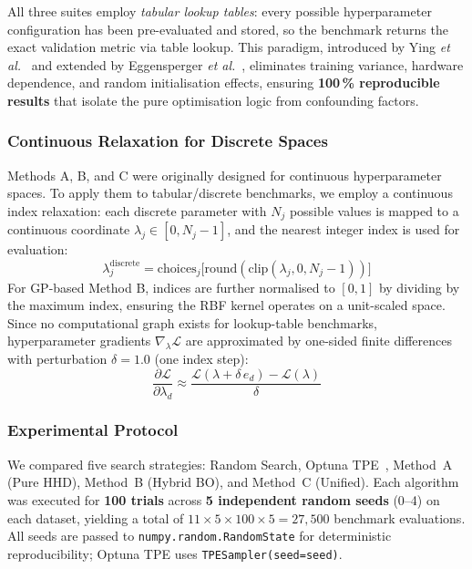 \documentclass[12pt,a4paper]{article}
\begin{document}
All three suites employ \emph{tabular lookup tables}: every possible
hyperparameter configuration has been pre-evaluated and stored, so the
benchmark returns the exact validation metric via table lookup.
This paradigm, introduced by Ying \emph{et al.}~\cite{ying2019nasbench101}
and extended by Eggensperger \emph{et al.}~\cite{eggensperger2021},
eliminates training variance, hardware dependence, and random
initialisation effects, ensuring \textbf{100\,\% reproducible results}
that isolate the pure optimisation logic from confounding factors.

\subsubsection{Continuous Relaxation for Discrete Spaces}

Methods A, B, and C were originally designed for continuous
hyperparameter spaces.  To apply them to tabular/discrete benchmarks,
we employ a continuous index relaxation: each discrete parameter
with $N_j$ possible values is mapped to a continuous coordinate
$\lambda_j \in [0, N_j - 1]$, and the nearest integer index is
used for evaluation:
\begin{equation}
\lambda_j^{\mathrm{discrete}} = \mathrm{choices}_j\bigl[
   \mathrm{round}(\mathrm{clip}(\lambda_j, 0, N_j-1))\bigr]
\label{eq:index_relax}
\end{equation}
For GP-based Method B, indices are further normalised to $[0,1]$ by
dividing by the maximum index, ensuring the RBF kernel operates on
a unit-scaled space.  Since no computational graph exists for lookup-table
benchmarks, hyperparameter gradients $\nabla_\lambda\mathcal{L}$
are approximated by one-sided finite differences with perturbation
$\delta = 1.0$ (one index step):
\begin{equation}
\frac{\partial\mathcal{L}}{\partial\lambda_d}
  \approx \frac{\mathcal{L}(\lambda + \delta\,e_d) -
                \mathcal{L}(\lambda)}{\delta}
\label{eq:fd_grad}
\end{equation}

\subsubsection{Experimental Protocol}

We compared five search strategies: Random Search, Optuna
TPE~\cite{akiba2019optuna,bergstra2011tpe}, Method~A (Pure HHD),
Method~B (Hybrid BO), and Method~C (Unified).  Each algorithm was
executed for \textbf{100 trials} across \textbf{5 independent random
seeds} (0--4) on each dataset, yielding a total of
$11 \times 5 \times 100 \times 5 = 27{,}500$ benchmark evaluations.
All seeds are passed to \texttt{numpy.random.RandomState} for
deterministic reproducibility; Optuna TPE uses
\texttt{TPESampler(seed=seed)}.
\end{document}
